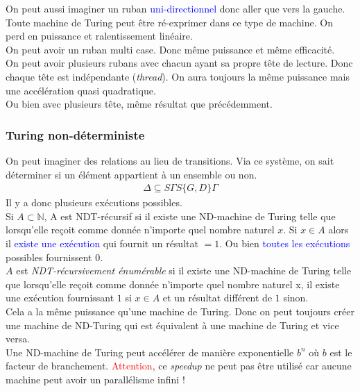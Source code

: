 \documentclass{report}
\begin{document}
On peut aussi imaginer un ruban \textcolor{blue}{uni-directionnel} donc aller que vers la gauche. Toute machine de Turing peut être ré-exprimer dans ce type de machine. On perd en puissance et ralentissement linéaire.\\
On peut avoir un ruban multi case. Donc même puissance et même efficacité.\\

On peut avoir plusieurs rubans avec chacun ayant sa propre tête de lecture. Donc chaque tête est indépendante (\textit{thread}). On aura toujours la même puissance mais une accélération quasi quadratique.\\
Ou bien avec plusieurs tête, même résultat que précédemment.

\subsubsection{Turing non-déterministe}
On peut imaginer des relations au lieu de transitions. Via ce système, on sait déterminer si un élément appartient à un ensemble ou non.
\begin{align*}
\Delta \subseteq S \Gamma S \{G,D\} \Gamma
\end{align*}
Il y a donc plusieurs exécutions possibles.\\
Si $A \subset \mathbb{N}$, A est NDT-récursif si il existe une ND-machine de Turing telle que lorsqu’elle reçoit comme donnée n’importe quel nombre naturel $x$. Si $x \in A$ alors il \textcolor{blue}{existe une exécution} qui fournit un résultat $=1$. Ou bien \textcolor{blue}{toutes les exécutions} possibles fournissent $0$.\\

$A$ est \textit{NDT-récursivement énumérable} si il existe une ND-machine de Turing telle que lorsqu'elle reçoit comme donnée n'importe quel nombre naturel x, il existe une exécution fournissant $1$ si $x \in A$ et un résultat différent de $1$ sinon.\\

Cela a la même puissance qu'une machine de Turing. Donc on peut toujours créer une machine de ND-Turing qui est équivalent à une machine de Turing et vice versa.\\
Une ND-machine de Turing peut accélérer de manière exponentielle $b^n$ où $b$ est le facteur de branchement. \textcolor{red}{Attention}, ce \textit{speedup} ne peut pas être utilisé car aucune machine peut avoir un parallélisme infini !
\end{document}
